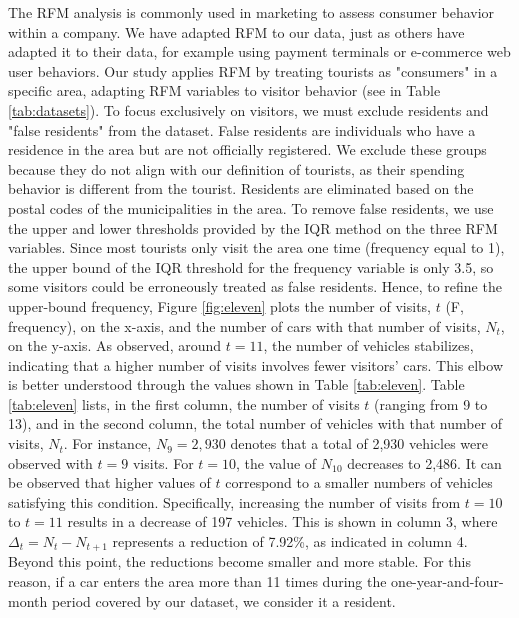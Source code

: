 \documentclass{ws-ijitdm}
\begin{document}
The RFM analysis is commonly used in marketing to assess consumer behavior within a company. We have adapted RFM to our data, just as others have adapted it to their data, for example using payment terminals\cite{8} or e-commerce web user behaviors\cite{7}. Our study applies RFM by treating tourists as "consumers" in a specific area, adapting RFM variables to visitor behavior (see in Table \ref{tab:datasets}). To focus exclusively on visitors, we must exclude residents and "false residents" from the dataset. False residents are individuals who have a residence in the area but are not officially registered. We exclude these groups because they do not align with our definition of tourists, as their spending behavior is different from the tourist. Residents are eliminated based on the postal codes of the municipalities in the area. To remove false residents, we use the upper and lower thresholds provided by the IQR method on the three RFM variables. Since most tourists only visit the area one time (frequency equal to 1), the upper bound of the IQR threshold for the frequency variable is only 3.5, so some visitors could be erroneously treated as false residents. {\color{black}Hence, to refine the upper-bound frequency, Figure \ref{fig:eleven} plots the number of visits, $t$ (F, frequency), on the x-axis, and the number of cars with that number of visits, $N_t$, on the y-axis. As observed, around $t = 11$, the number of vehicles stabilizes, indicating that a higher number of visits involves fewer visitors’ cars. This elbow is better understood through the values shown in Table \ref{tab:eleven}. Table \ref{tab:eleven} lists, in the first column, the number of visits $t$ (ranging from 9 to 13), and in the second column, the total number of vehicles with that number of visits, $N_t$. For instance, $N_9 = 2,930$ denotes that a total of 2,930 vehicles were observed with $t = 9$ visits. For $t = 10$, the value of $N_{10}$ decreases to 2,486. It can be observed that higher values of $t$ correspond to a smaller numbers of vehicles satisfying this condition. Specifically, increasing the number of visits from $t = 10$ to $t = 11$ results in a decrease of 197 vehicles. This is shown in column 3, where $\Delta_t = N_t - N_{t+1}$ represents a reduction of 7.92\%, as indicated in column 4. Beyond this point, the reductions become smaller and more stable. For this reason, if a car enters the area more than 11 times during the one-year-and-four-month period covered by our dataset, we consider it a resident.}
\end{document}

